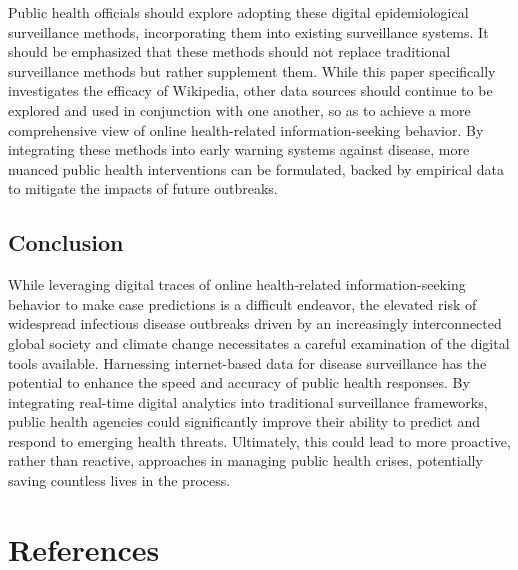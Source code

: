 \documentclass[
  12pt,
]{article}
\begin{document}
Public health officials should explore adopting these digital
epidemiological surveillance methods, incorporating them into existing
surveillance systems. It should be emphasized that these methods should
not replace traditional surveillance methods but rather supplement them.
While this paper specifically investigates the efficacy of Wikipedia,
other data sources should continue to be explored and used in
conjunction with one another, so as to achieve a more comprehensive view
of online health-related information-seeking behavior. By integrating
these methods into early warning systems against disease, more nuanced
public health interventions can be formulated, backed by empirical data
to mitigate the impacts of future outbreaks.

\subsection{Conclusion}\label{conclusion}

While leveraging digital traces of online health-related
information-seeking behavior to make case predictions is a difficult
endeavor, the elevated risk of widespread infectious disease outbreaks
driven by an increasingly interconnected global society and climate
change necessitates a careful examination of the digital tools
available. Harnessing internet-based data for disease surveillance has
the potential to enhance the speed and accuracy of public health
responses. By integrating real-time digital analytics into traditional
surveillance frameworks, public health agencies could significantly
improve their ability to predict and respond to emerging health threats.
Ultimately, this could lead to more proactive, rather than reactive,
approaches in managing public health crises, potentially saving
countless lives in the process.

\section*{References}\label{references}
\end{document}
